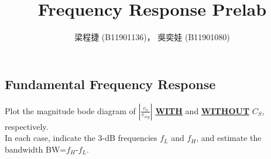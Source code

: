 \documentclass{article}
\title{Frequency Response Prelab}
\author{梁程捷 (B11901136)， 吳奕娃 (B11901080)}
\date{}
\begin{document}
\begin{CJK*}{UTF8}{bkai}

\maketitle

\section{Fundamental Frequency Response}
Plot the magnitude bode diagram of $\displaystyle{\left\lvert \frac{v_o}{v_{sig}}\right\rvert}$ \textbf{\underline{WITH}} and \textbf{\underline{WITHOUT}} $C_S$, respectively. \\
In each case, indicate the 3-dB frequencies $f_L$ and $f_H$, and estimate the bandwidth BW=$f_H$-$f_L$. \\

\begin{figure}[h]
    \begin{center}
    

\end{center}
\end{figure}
\end{CJK*}
\end{document}
